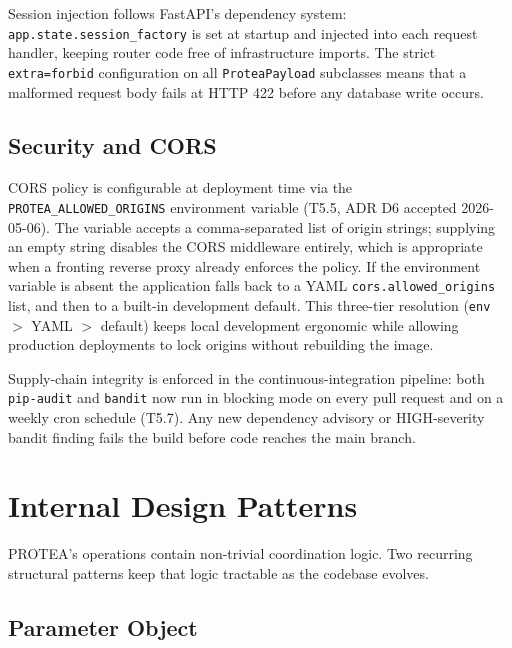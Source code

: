 \begin{sloppypar}
Session injection follows FastAPI's dependency system:
\texttt{app.state.session\_factory} is set at startup and injected into each
request handler, keeping router code free of infrastructure imports. The strict
\texttt{extra=forbid} configuration on all \texttt{ProteaPayload} subclasses
means that a malformed request body fails at HTTP 422 before any database write
occurs.
\end{sloppypar}

\subsection{Security and CORS}
\label{subsec:security-cors}

CORS policy is configurable at deployment time via the
\texttt{PROTEA\_ALLOWED\_ORIGINS} environment variable (T5.5, ADR D6 accepted
2026-05-06). The variable accepts a comma-separated list of origin strings;
supplying an empty string disables the CORS middleware entirely, which is
appropriate when a fronting reverse proxy already enforces the policy. If the
environment variable is absent the application falls back to a YAML
\texttt{cors.allowed\_origins} list, and then to a built-in development default.
This three-tier resolution (\texttt{env} $>$ YAML $>$ default) keeps local
development ergonomic while allowing production deployments to lock origins
without rebuilding the image.

Supply-chain integrity is enforced in the continuous-integration pipeline: both
\texttt{pip-audit} and \texttt{bandit} now run in blocking mode on every pull
request and on a weekly cron schedule (T5.7). Any new dependency advisory or
HIGH-severity bandit finding fails the build before code reaches the main branch.

\section{Internal Design Patterns}
\label{sec:design-patterns}

PROTEA's operations contain non-trivial coordination logic. Two recurring
structural patterns keep that logic tractable as the codebase evolves.

\subsection{Parameter Object}
\label{subsec:parameter-object}

